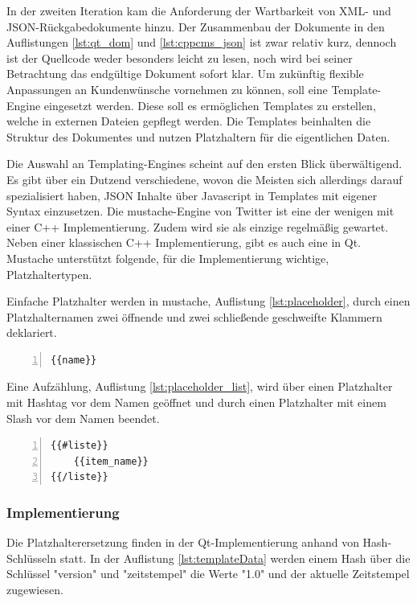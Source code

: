 \documentclass{article}
\begin{document}
In der zweiten Iteration kam die Anforderung der Wartbarkeit von XML- und JSON-Rückgabedokumente hinzu. Der Zusammenbau der Dokumente in den Auflistungen \ref{lst:qt_dom} und \ref{lst:cppcms_json} ist zwar relativ kurz, dennoch ist der Quellcode weder besonders leicht zu lesen, noch wird bei seiner Betrachtung das endgültige Dokument sofort klar. Um zukünftig flexible Anpassungen an Kundenwünsche vornehmen zu können, soll eine Template-Engine eingesetzt werden. Diese soll es ermöglichen Templates zu erstellen, welche in externen Dateien gepflegt werden. Die Templates beinhalten die Struktur des Dokumentes und nutzen Platzhaltern für die eigentlichen Daten.

Die Auswahl an Templating-Engines scheint auf den ersten Blick überwältigend. Es gibt über ein Dutzend verschiedene, wovon die Meisten sich allerdings darauf spezialisiert haben, JSON Inhalte über Javascript in Templates mit eigener Syntax einzusetzen. Die mustache-Engine von Twitter ist eine der wenigen mit einer C++ Implementierung. Zudem wird sie als einzige regelmäßig gewartet. Neben einer klassischen C++ Implementierung, gibt es auch eine in Qt. Mustache unterstützt folgende, für die Implementierung wichtige, Platzhaltertypen. 

Einfache Platzhalter werden in mustache, Auflistung \ref{lst:placeholder}, durch einen Platzhalternamen zwei öffnende und zwei schließende geschweifte Klammern deklariert.

\begin{lstlisting}[caption=Einfache Platzhalter, label=lst:placeholder, frame=single, numbers=left, tabsize=3, captionpos=b]
{{name}}
\end{lstlisting}

Eine Aufzählung, Auflistung \ref{lst:placeholder_list}, wird über einen Platzhalter mit Hashtag vor dem Namen geöffnet und durch einen Platzhalter mit einem Slash vor dem Namen beendet.

\begin{lstlisting}[caption=Platzhalterliste, label=lst:placeholder_list, frame=single, numbers=left, tabsize=3, captionpos=b]
{{#liste}}
	{{item_name}}
{{/liste}}
\end{lstlisting}

\subsubsection{Implementierung}

Die Platzhalterersetzung finden in der Qt-Implementierung anhand von Hash-Schlüsseln statt. In der Auflistung \ref{lst:templateData} werden einem Hash über die Schlüssel "version" und "zeitstempel" die Werte "1.0" und der aktuelle Zeitstempel zugewiesen.
\end{document}
